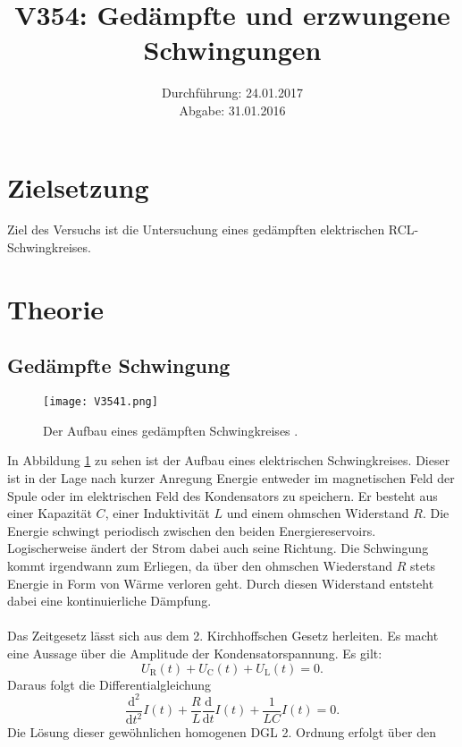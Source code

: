 \documentclass[
  bibliography=totoc,     %
  captions=tableheading,  %
  titlepage=firstiscover, %
]{scrartcl}
\title{V354: Gedämpfte und erzwungene Schwingungen}
\author{
  Simon Schulte
  \texorpdfstring{
    \\
    \href{mailto:simon.schulte@udo.edu}{simon.schulte@udo.edu}
  }{}
  \texorpdfstring{\and}{, }
  Tim Sedlaczek
  \texorpdfstring{
    \\
    \href{mailto:tim.sedlaczek@udo.edu}{tim.sedlaczek@udo.edu}
  }{}
}
\date{Durchführung: 24.01.2017\\
      Abgabe: 31.01.2016}
\begin{document}
\maketitle
\thispagestyle{empty}
\tableofcontents
\newpage
\section{Zielsetzung}
\label{sec:zielsetzung}
Ziel des Versuchs ist die Untersuchung eines gedämpften elektrischen
RCL-Schwingkreises.
\section{Theorie}
\label{sec:theorie}
\subsection{Gedämpfte Schwingung}
\label{sub:gedämpft}
\begin{figure}[htb]
  \centering
  \texttt{[image: V3541.png]}
  \caption{Der Aufbau eines gedämpften Schwingkreises \cite{anleitung}.}
  \label{fig:V3541}
\end{figure}
In Abbildung \ref{fig:V3541} zu sehen ist der Aufbau eines elektrischen
Schwingkreises. Dieser ist in der Lage nach kurzer Anregung Energie entweder
im magnetischen Feld der Spule oder im elektrischen Feld des Kondensators zu
speichern. Er besteht aus einer Kapazität $C$, einer Induktivität $L$ und einem
ohmschen Widerstand $R$. Die Energie schwingt periodisch zwischen den beiden
Energiereservoirs. Logischerweise ändert der Strom dabei auch seine Richtung.
Die Schwingung kommt irgendwann zum Erliegen, da über den ohmschen Wiederstand
$R$ stets Energie in Form von Wärme verloren geht. Durch diesen Widerstand
entsteht dabei eine kontinuierliche Dämpfung. \\
\\
Das Zeitgesetz lässt sich aus dem 2. Kirchhoffschen Gesetz herleiten.
Es macht eine Aussage über die Amplitude der Kondensatorspannung. Es gilt:
\begin{equation}
    U_{\mathup{R}}(t)+U_{\mathup{C}}(t)+U_{\mathup{L}}(t)=0.
    \label{eqn:kirchhoff}
\end{equation}
Daraus folgt die Differentialgleichung
\begin{equation}
    \frac{\mathup{d}^2}{\mathup{d}t^2}I(t)+\frac{R}{L}\frac{\mathup{d}}{\mathup{d}t}I(t)+\frac{1}{LC}I(t)=0.
    \label{eqn:dgl}
\end{equation}
Die Lösung dieser gewöhnlichen homogenen DGL 2. Ordnung erfolgt über den
\end{document}

